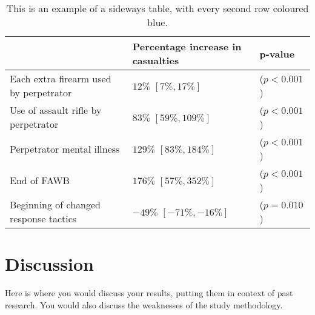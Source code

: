 \documentclass[12pt]{article}
\begin{document}
\begin{sidewaystable}
\begin{center}
\caption{
This is an example of a sideways table, with every second row coloured blue.
}\hspace*{1in}\label{tab:table2}
\begin{tabular}{lll}
\hline
 & Percentage increase in casualties &  p-value \\
\hline
\rowcolor{LightCyan}
 Each extra firearm used by perpetrator   &     $12\%$ $[7\%,17\%]$ & ($p\!<\!0.001$)   \\
    Use of assault rifle by perpetrator   &   $83\%$ $[59\%,109\%]$ & ($p\!<\!0.001$)   \\
\rowcolor{LightCyan}
             Perpetrator mental illness   &  $129\%$ $[83\%,184\%]$ & ($p\!<\!0.001$)   \\
                            End of FAWB   &  $176\%$ $[57\%,352\%]$ & ($p\!<\!0.001$)   \\
\rowcolor{LightCyan}
  Beginning of changed response tactics   & $-49\%$ $[-71\%,-16\%]$ &       ($p=0.010$)   \\
\hline
\end{tabular}
\end{center}
\end{sidewaystable}


\clearpage


\section{Discussion}

Here is where you would discuss your results, putting them in context of past research.
You would also discuss the weaknesses of the study methodology.
\end{document}

